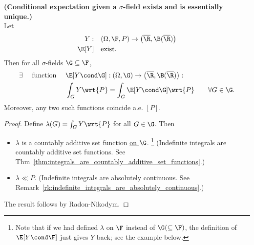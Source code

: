 \documentclass{article} %
\begin{document}
\begin{theorem}\textbf{(Conditional expectation given a $\sigma$-field exists and is essentially unique.)} \\
Let 
\begin{align*}
	Y: & \quad (\Omega, \F, P) \to \big(\overline{\R}, \B(\overline{\R}) \big) \\
	\E[Y] & \quad \text{exist}. 
\end{align*}
Then for all $\sigma$-fields $\G \subseteq \F$,
\begin{align*}	
\exists \quad \text{ function } \quad & \E[Y \cond \G]	: (\Omega, \G) \to \big(\overline{\R}, \B(\overline{\R}) \big)  : \\
& \int_G Y \wrt{P} = \int_G \E[Y \cond \G] \wrt{P} \quad \quad \forall G \in \G.  
\end{align*}
Moreover, any two such functions coincide a.e. $[P]$.
\label{thm:existence_of_conditional_expectation_given_a_sigma_field}
\end{theorem}

\begin{proof}
Define $\lambda(G) = \int_G Y \wrt{P}$ for all $G \in \G$. Then 
\begin{itemize}
\item $\lambda$ is a countably additive set function \underline{on $\G$}. \footnote{Note that if we had defined $\lambda$ on $\F$ instead of  $\G (\subseteq \F)$, the definition of $\E[Y \cond \F]$ just gives $Y$ back; see the example below.}   {\scriptsize (Indefinite integrals are countably additive set functions.  See Thm~\ref{thm:integrals_are_countably_additive_set_functions}.)}
\item $\lambda \ll P$.  {\scriptsize (Indefinite integrals are absolutely continuous. See Remark~\ref{rk:indefinite_integrals_are_absolutely_continuous}.)}
\end{itemize}
The result follows by Radon-Nikodym.
\end{proof}
\end{document}
